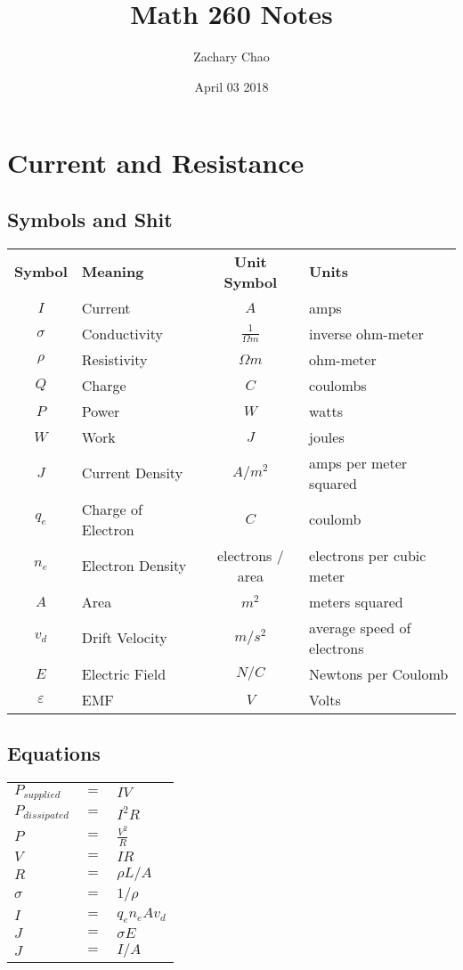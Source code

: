 \documentclass[12pt, letterpaper, twoside]{article}
\title{Math 260 Notes}
\author{Zachary Chao}
\date{April 03 2018}
\begin{document}
\setcounter{section}{8}
\section{Current and Resistance}
  \subsection*{Symbols and Shit}
    \begin{tabular}{c l c l}
  	  \textbf{Symbol} & \textbf{Meaning} & \textbf{Unit Symbol} & \textbf{Units}\\
      $I$ & Current & $A$ & amps\\
      $\sigma$ & Conductivity & $\frac{1}{\Omega m}$ & inverse ohm-meter\\
      $\rho$ & Resistivity & $\Omega m$ & ohm-meter\\
      $Q$ & Charge & $C$ & coulombs\\
      $P$ & Power & $W$ & watts\\
      $W$ & Work & $J$ & joules\\
      $J$ & Current Density & $A/m^2$ & amps per meter squared\\
      $q_e$ & Charge of Electron & $C$ & coulomb\\
      $n_e$ & Electron Density & electrons / area & electrons per cubic meter\\
      $A$ & Area & $m^2$ & meters squared\\
      $v_d$ & Drift Velocity & $m/s^2$ & average speed of electrons\\
      $E$ & Electric Field & $N/C$ & Newtons per Coulomb\\
      $\varepsilon$ & EMF & $V$ & Volts\\
    \end{tabular}
  
  \subsection*{Equations}
    \begin{tabular}{l c l}
      $P_{supplied}$ & $=$ & $IV$\\
      $P_{dissipated}$ & $=$ & $I^2R$\\
      $P$ & $=$ & $\frac{V^2}{R}$\\
      $V$ & $=$ & $IR$\\
      $R$ & $=$ & $\rho L / A$\\
      $\sigma$ & $=$ & $1/\rho$\\
      $I$ & $=$ & $q_en_eAv_d$\\
      $J$ & $=$ & $\sigma E$\\
      $J$ & $=$ & $I/A$\\
    \end{tabular}
    
\end{document}
